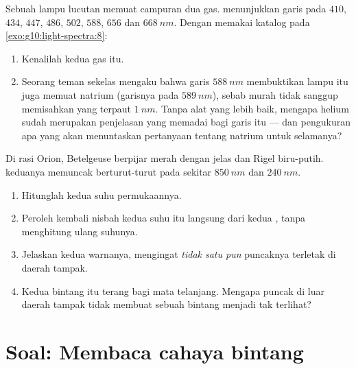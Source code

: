 \begin{exercise}[$\star\star\star$]\label{exo:g10:light-spectra:14}
Sebuah lampu lucutan memuat campuran dua gas.  menunjukkan
garis pada $410$, $434$, $447$, $486$, $502$, $588$, $656$ dan
$\qty{668}{nm}$. Dengan memakai katalog pada
\cref{exo:g10:light-spectra:8}:
\begin{enumerate}
  \item Kenalilah kedua gas itu.
  \item Seorang teman sekelas mengaku bahwa garis $\qty{588}{nm}$
        membuktikan lampu itu juga memuat natrium (garisnya pada
        $\qty{589}{nm}$), sebab  murah tidak sanggup
        memisahkan  yang terpaut $\qty{1}{nm}$. Tanpa
        alat yang lebih baik, mengapa helium sudah merupakan penjelasan
        yang memadai bagi garis itu --- dan pengukuran apa yang akan
        menuntaskan pertanyaan tentang natrium untuk selamanya?
\end{enumerate}
\end{exercise}

\begin{exercise}[$\star\star\star$]\label{exo:g10:light-spectra:15}
Di rasi Orion, Betelgeuse berpijar merah dengan jelas dan Rigel
biru-putih.  keduanya memuncak berturut-turut pada
sekitar $\qty{850}{nm}$ dan $\qty{240}{nm}$.
\begin{enumerate}
  \item Hitunglah kedua suhu permukaannya.
  \item Peroleh kembali nisbah kedua suhu itu langsung dari kedua
        , tanpa menghitung ulang suhunya.
  \item Jelaskan kedua warnanya, mengingat \emph{tidak satu pun}
        puncaknya terletak di daerah tampak.
  \item Kedua bintang itu terang bagi mata telanjang. Mengapa puncak di
        luar daerah tampak tidak membuat sebuah bintang menjadi tak
        terlihat?
\end{enumerate}
\end{exercise}

\section{Soal: Membaca cahaya bintang}

